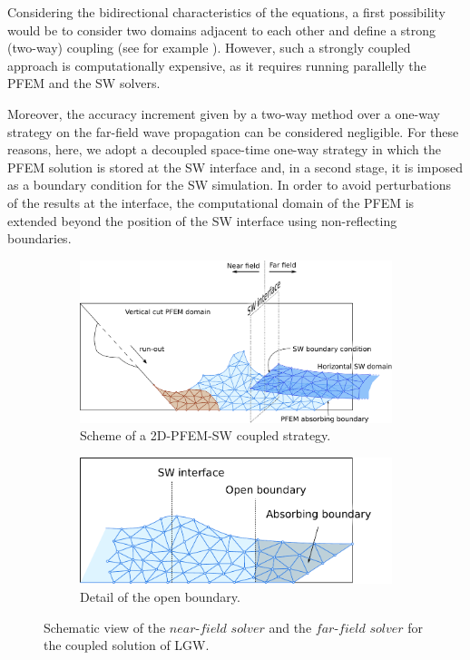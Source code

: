 Considering the bidirectional characteristics of the equations, a first possibility would be to consider two domains adjacent to each other and define a strong (two-way) coupling (see for example \cite{pringle2016}).
However, such a strongly coupled approach is computationally expensive, as it requires running parallelly the PFEM and the SW solvers. 

Moreover, the accuracy increment given by a two-way method over a one-way strategy on the far-field wave propagation can be considered negligible. For these reasons, here, we adopt a decoupled space-time one-way strategy in which the PFEM solution is stored at the SW interface and, in a second stage, it is imposed as a boundary condition for the SW simulation. In order to avoid perturbations of the results at the interface, the computational domain of the PFEM is extended beyond the position of the SW interface using non-reflecting boundaries.



\begin{figure} [htb]
    \begin{subfigure}{\textwidth}
        \centering
        \includegraphics[width=\columnwidth]{img/coupling/modelView.pdf}
        \caption{Scheme of a 2D-PFEM-SW coupled strategy.}
        \label{coupling_model_simplified}
        \vspace{1em}
    \end{subfigure}
    \begin{subfigure}{\textwidth}
        \centering
        \includegraphics[width=\columnwidth]{img/coupling/open_boundary.pdf}
        \caption{Detail of the open boundary.}
        \label{coupling_model_boundary}
    \end{subfigure}
    \caption{Schematic view of the $near$-$field$ $solver$ and the $far$-$field$ $solver$ for the coupled solution of LGW.}        
    \label{coupling_model_scheme}
\end{figure}



